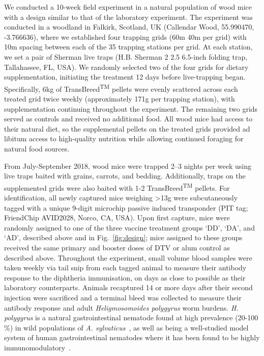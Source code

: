 \documentclass[a4paper, hidelinks, 11pt]{article}
\begin{document}
We conducted a 10-week field experiment in a natural population of wood mice with a design similar to that of the laboratory experiment. The experiment was conducted in a woodland in Falkirk, Scotland, UK (Callendar Wood, 55.990470, -3.766636), where we established four trapping grids (60m \times{} 40m per grid) with 10m spacing between each of the 35 trapping stations per grid. At each station, we set a pair of Sherman live traps (H.B. Sherman 2 \times{} 2.5 \times{} 6.5-inch folding trap, Tallahassee, FL, USA). We randomly selected two of the four grids for dietary supplementation, initiating the treatment 12 days before live-trapping began. Specifically, 6kg of TransBreed\textsuperscript{TM} pellets were evenly scattered across each treated grid twice weekly (approximately 171g per trapping station), with supplementation continuing throughout the experiment. The remaining two grids served as controls and received no additional food. All wood mice had access to their natural diet, so the supplemental pellets on the treated grids provided ad libitum access to high-quality nutrition while allowing continued foraging for natural food sources.

From July-September 2018, wood mice were trapped 2–3 nights per week using live traps baited with grains, carrots, and bedding. Additionally, traps on the supplemented grids were also baited with 1-2 TransBreed\textsuperscript{TM} pellets. For identification, all newly captured mice weighing >13g were subcutaneously tagged with a unique 9-digit microchip passive induced transponder (PIT tag; FriendChip AVID2028, Norco, CA, USA). Upon first capture, mice were randomly assigned to one of the three vaccine treatment groups `DD', `DA', and `AD', described above and in Fig.~\ref{fig:design}; mice assigned to these groups received the same primary and booster doses of DTV or alum control as described above. Throughout the experiment, small volume blood samples were taken weekly via tail snip from each tagged animal to measure their antibody response to the diphtheria immunisation, on days as close to possible as their laboratory counterparts. Animals recaptured 14 or more days after their second injection were sacrificed and a terminal bleed was collected to measure their antibody response and adult \textit{Heligmosomoides polygyrus} worm burdens. \textit{H. polygyrus} is a natural gastrointestinal nematode found at high prevalence (20-100 \%) in wild populations of \textit{A. sylvaticus}~\cite{Sweeny2021,Gregory1990,Keymer1987,Knowles2013}, as well as being a well-studied model system of human gastrointestinal nematodes where it has been found to be highly immunomodulatory~\cite{Maizels2012a,Reynolds2012a}.
\end{document}

